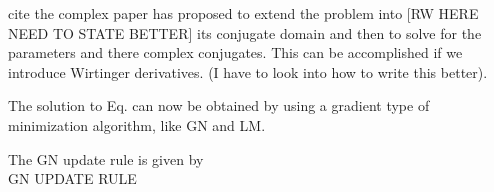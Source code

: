 \documentclass[useAMS,usenatbib]{mn2e}
\begin{document}
cite the complex paper has proposed to extend the problem into [RW HERE NEED TO STATE BETTER] its conjugate domain and then to solve for the parameters and there complex conjugates. This can be accomplished
if we introduce Wirtinger derivatives. (I have to look into how to write this better).

The solution to Eq. can now be obtained by using a gradient type of minimization algorithm, like GN and LM. 

The GN update rule is given by\\

GN UPDATE RULE


% 
% 
% 
% 
% 
% 
\end{document}
